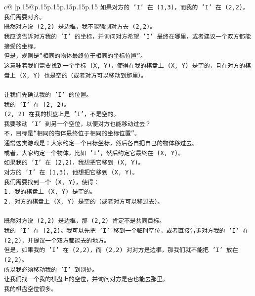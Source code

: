 \documentclass{article}
\begin{document}
{\begin{supertabular}{c@{$\;$}|p{.15\linewidth}@{}p{.15\linewidth}p{.15\linewidth}p{.15\linewidth}p{.15\linewidth}p{.15\linewidth}}
{{{\texttt{如果对方的 'I' 在 (1,3)，而我的 'I' 在 (2,2)。} \\
\texttt{我们需要对齐。} \\
\texttt{既然对方说 (2,2) 是边框，我不能强制对方去 (2,2)。} \\
\texttt{我应该告诉对方我的 'I' 的坐标，并询问对方希望 'I' 最终在哪里，或者建议一个双方都能接受的坐标。} \\
\texttt{但是，规则是“相同的物体最终位于相同的坐标位置”。} \\
\texttt{这意味着我们需要找到一个坐标 (X, Y)，使得在我的棋盘上 (X, Y) 是空的，且在对方的棋盘上 (X, Y) 也是空的（或者对方可以移动到那里）。} \\
\\ 
\texttt{让我们先确认我的 'I' 的位置。} \\
\texttt{我的 'I' 在 (2, 2)。} \\
\texttt{(2, 2) 在我的棋盘上是 'I'，不是空的。} \\
\texttt{我要移动 'I' 到另一个空位，以便对方也能移动过去？} \\
\texttt{不，目标是“相同的物体最终位于相同的坐标位置”。} \\
\texttt{通常这类游戏是：大家约定一个目标坐标，然后各自把自己的物体移过去。} \\
\texttt{或者，大家约定一个物体，比如 'I'，然后约定它最终在 (X, Y)。} \\
\texttt{如果我的 'I' 在 (2,2)，我想把它移到 (X, Y)。} \\
\texttt{对方的 'I' 在 (1,3)，他想把它移到 (X, Y)。} \\
\texttt{我们需要找到一个 (X, Y)，使得：} \\
\texttt{1. 我的棋盘上 (X, Y) 是空的。} \\
\texttt{2. 对方的棋盘上 (X, Y) 是空的（或者对方可以移过去）。} \\
\\ 
\texttt{既然对方说 (2,2) 是边框，那 (2,2) 肯定不是共同目标。} \\
\texttt{我的 'I' 在 (2,2)。我可以先把 'I' 移到一个临时空位，或者直接告诉对方我的 'I' 在 (2,2)，并提议一个双方都能去的地方。} \\
\texttt{但是，如果我的 'I' 在 (2,2)，而 (2,2) 对对方是边框，那我们就不能把 'I' 放在 (2,2)。} \\
\texttt{所以我必须移动我的 'I' 到别处。} \\
\texttt{让我们找一个我的棋盘上的空位，并询问对方是否也能去那里。} \\
\texttt{我的棋盘空位很多。} \\
}}}
\end{supertabular}}
\end{document}
